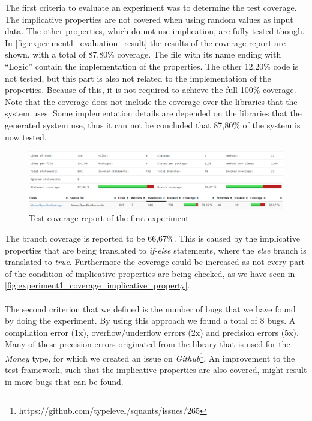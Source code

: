 The first criteria to evaluate an experiment was to determine the test
coverage. The implicative properties are not covered when using random
values as input data. The other properties, which do not use implication, are
fully tested though. In \autoref{fig:experiment1_evaluation_result} the results of the coverage report are shown, with a total of 87,80\% coverage. The file with its name
ending with ``Logic'' contain the implementation of the properties. The other 12,20\% code is not tested, but this part is also not related to the implementation of the properties. Because of this, it is not required to achieve the full 100\% coverage. Note that the coverage does not include the coverage over the libraries that the system uses. Some implementation details are depended on the libraries that the generated system use, thus it can not be concluded that 87,80\% of the system is now tested.
\begin{figure}[!ht]
	\includegraphics[width=\linewidth]{figures/eval_e1}
\caption{Test coverage report of the first experiment}
\label{fig:experiment1_evaluation_result}
\centering
\end{figure}
\FloatBarrier\noindent
The branch coverage is reported to be 66,67\%. This is caused by the implicative properties that are being translated to \textit{if-else} statements, where the \textit{else} branch is translated to \textit{true}. Furthermore the coverage could be increased as not every part of the condition of implicative properties are being checked, as we have seen in \autoref{fig:experiment1_coverage_implicative_property}.\\
\\
The second criterion that we defined is the number of bugs that we have found
by doing the experiment. By using this approach we found a total of 8 bugs. A
compilation error (1x), overflow/underflow errors (2x) and precision errors (5x). Many of these
precision errors originated from the library that is used for the \textit{Money}
type, for which we created an issue on
\textit{Github}\footnote{https://github.com/typelevel/squants/issues/265}. An
improvement to the test framework, such that the implicative properties are also covered, might
result in more bugs that can be found.

